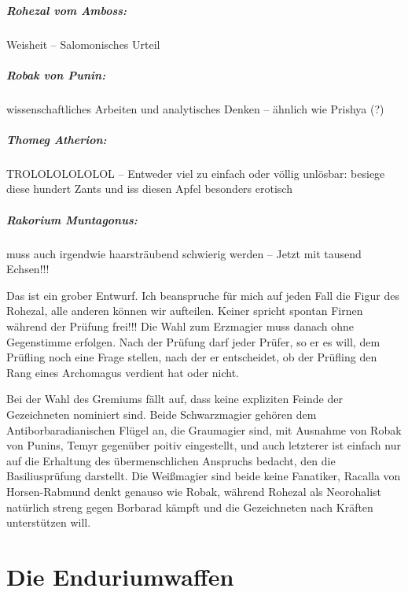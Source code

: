 \paragraph{Rohezal vom Amboss:}	Weisheit -- Salomonisches Urteil
\paragraph{Robak von Punin:} wissenschaftliches Arbeiten und analytisches Denken -- ähnlich wie Prishya (?)
\paragraph{Thomeg Atherion:} TROLOLOLOLOLOL -- Entweder viel zu einfach oder völlig unlösbar: besiege diese hundert Zants und iss diesen Apfel besonders erotisch
\paragraph{Rakorium Muntagonus:} muss auch irgendwie haarsträubend schwierig werden -- Jetzt mit tausend Echsen!!!

Das ist ein grober Entwurf. Ich beanspruche für mich auf jeden Fall die Figur des Rohezal, alle anderen können wir aufteilen. Keiner spricht spontan Firnen während der Prüfung frei!!! Die Wahl zum Erzmagier muss danach ohne Gegenstimme erfolgen. Nach der Prüfung darf jeder Prüfer, so er es will, dem Prüfling noch eine Frage stellen, nach der er entscheidet, ob der Prüfling den Rang eines Archomagus verdient hat oder nicht.

Bei der Wahl des Gremiums fällt auf, dass keine expliziten Feinde der Gezeichneten nominiert sind. Beide Schwarzmagier gehören dem Antiborbaradianischen Flügel an, die Graumagier sind, mit Ausnahme von Robak von Punins, Temyr gegenüber poitiv eingestellt, und auch letzterer ist einfach nur auf die Erhaltung des übermenschlichen Anspruchs bedacht, den die Basiliusprüfung darstellt. Die Weißmagier sind beide keine Fanatiker, Racalla von Horsen-Rabmund denkt genauso wie Robak, während Rohezal als Neorohalist natürlich streng gegen Borbarad kämpft und die Gezeichneten nach Kräften unterstützen will.

\chapter{Die Enduriumwaffen}

